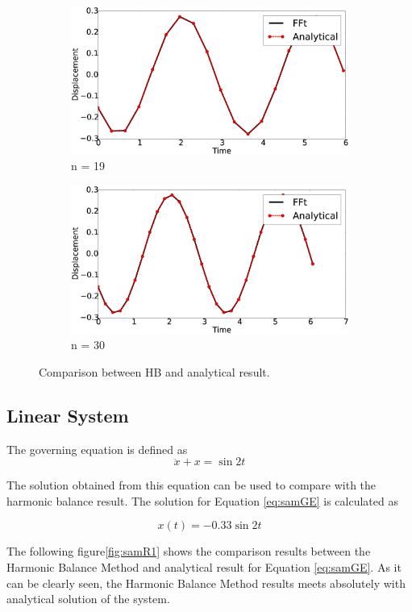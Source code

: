 \documentclass[12pt, a4paper]{extarticle}
\begin{document}
\begin{figure}[H]
	\centering
	\begin{subfigure}[h]{8.0 cm}
		\includegraphics[width=8.0 cm]{figure/1N19.eps}
		\caption{n = 19}
	\end{subfigure}
	\begin{subfigure}[h]{8.0 cm}
        \includegraphics[width=8.0 cm]{figure/1N30.eps}
		\caption{n = 30}
    \end{subfigure}
    \caption{Comparison between HB and analytical result.}
    \label{fig:R1}
\end{figure}

\subsection{Linear System}
The governing equation is defined as
\begin{equation}\label{eq:samGE}
	\ddot{x} + x = \sin 2t
\end{equation}
 
The solution obtained from this equation can be used to compare with  the harmonic balance result. The solution for Equation \eqref{eq:samGE} is calculated as

\begin{equation}
	x(t) = -0.33 \sin 2t
\end{equation}

The following figure\ref{fig:samR1} shows the comparison results between the Harmonic Balance Method and analytical result for Equation \eqref{eq:samGE}. As it can be clearly seen, the Harmonic Balance Method results meets absolutely with analytical solution of the system.
\end{document}
